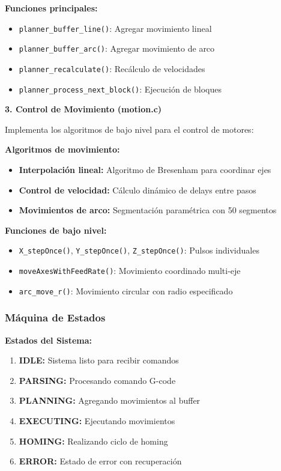 \documentclass[12pt]{article}
\begin{document}
\textbf{Funciones principales:}
\begin{itemize}
    \item \texttt{planner\_buffer\_line()}: Agregar movimiento lineal
    \item \texttt{planner\_buffer\_arc()}: Agregar movimiento de arco
    \item \texttt{planner\_recalculate()}: Recálculo de velocidades
    \item \texttt{planner\_process\_next\_block()}: Ejecución de bloques
\end{itemize}

\textbf{3. Control de Movimiento (motion.c)}

Implementa los algoritmos de bajo nivel para el control de motores:

\textbf{Algoritmos de movimiento:}
\begin{itemize}
    \item \textbf{Interpolación lineal:} Algoritmo de Bresenham para coordinar ejes
    \item \textbf{Control de velocidad:} Cálculo dinámico de delays entre pasos
    \item \textbf{Movimientos de arco:} Segmentación paramétrica con 50 segmentos
\end{itemize}

\textbf{Funciones de bajo nivel:}
\begin{itemize}
    \item \texttt{X\_stepOnce()}, \texttt{Y\_stepOnce()}, \texttt{Z\_stepOnce()}: Pulsos individuales
    \item \texttt{moveAxesWithFeedRate()}: Movimiento coordinado multi-eje
    \item \texttt{arc\_move\_r()}: Movimiento circular con radio especificado
\end{itemize}

\subsubsection{Máquina de Estados}

\textbf{Estados del Sistema:}
\begin{enumerate}
    \item \textbf{IDLE:} Sistema listo para recibir comandos
    \item \textbf{PARSING:} Procesando comando G-code
    \item \textbf{PLANNING:} Agregando movimientos al buffer
    \item \textbf{EXECUTING:} Ejecutando movimientos
    \item \textbf{HOMING:} Realizando ciclo de homing
    \item \textbf{ERROR:} Estado de error con recuperación
\end{enumerate}
\end{document}
